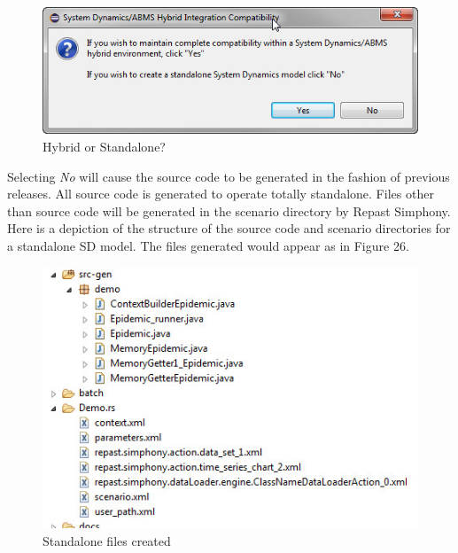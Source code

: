 \documentclass[11pt]{amsart}
\begin{document}
\begin{figure}[ht]
\begin{center}
\vspace{.2in}
\centerline {
\includegraphics[totalheight=0.3\textheight]{images/decision.jpg}
}
\caption{Hybrid or Standalone?}
\label{fig:025}
\end{center}
\end{figure}

 Selecting \textit{No} will cause the source code to be generated in the fashion of previous releases. All source code is generated to operate totally standalone. Files other than source code will be generated in the scenario directory by Repast Simphony. Here is a depiction of the structure of the source code and scenario directories for a standalone SD model. The files generated would appear as in Figure 26.

\begin{figure}[ht]
\begin{center}
\vspace{.2in}
\centerline {
\includegraphics[totalheight=0.3\textheight]{images/standalone.jpg}
}
\caption{Standalone files created}
\label{fig:026}
\end{center}
\end{figure}
\end{document}
